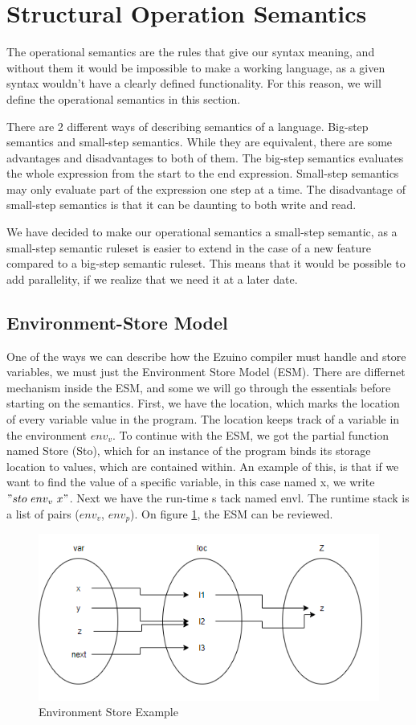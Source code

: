 \section{Structural Operation Semantics}
The operational semantics are the rules that give our syntax meaning, and without them it would be impossible to make a working language, as a given syntax wouldn't have a clearly defined functionality. For this reason, we will define the operational semantics in this section.

There are 2 different ways of describing semantics of a language. Big-step semantics and small-step semantics. While they are equivalent, there are some advantages and disadvantages to both of them. The big-step semantics evaluates the whole expression from the start to the end expression. Small-step semantics may only evaluate part of the expression one step at a time. The disadvantage of small-step semantics is that it can be daunting to both write and read.

We have decided to make our operational semantics a small-step semantic, as a small-step semantic ruleset is easier to extend in the case of a new feature compared to a big-step semantic ruleset. This means that it would be possible to add parallelity, if we realize that we need it at a later date.

\subsection{Environment-Store Model}
One of the ways we can describe how the Ezuino compiler must handle and store variables, we must just the Environment Store Model (ESM). There are differnet mechanism inside the ESM, and some we will go through the essentials before starting on the semantics. First, we have the location, which marks the location of every variable value in the program. The location keeps track of a variable in the environment $env_v$.
To continue with the ESM, we got the partial function named Store (Sto), which for an instance of the program binds its storage location to values, which are contained within. An example of this, is that if we want to find the value of a specific variable, in this case named x, we write $"sto \  env_v \ x"$.
Next we have the run-time s tack named envl. The runtime stack is a list of pairs ($env_v$, $env_p$).
On figure \ref{evnstoreexmp}, the ESM can be reviewed.
\begin{figure}[H]
\centering
\includegraphics[scale=0.75]{figures/evnstore.png}
\caption{Environment Store Example}
\label{evnstoreexmp}
\end{figure}



